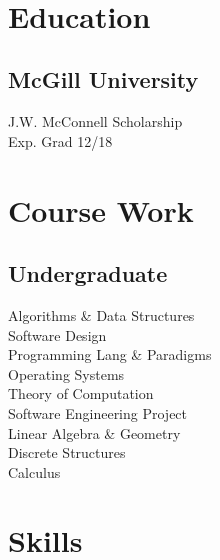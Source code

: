 \documentclass[]{allanwang-resume}
\begin{document}
\header

\begin{minipage}[t][][b]{0.33\textwidth}~


	\vspace{0.26cm}

	\section{Education}
	\subsection{McGill University}
	J.W. McConnell Scholarship \\
	Exp. Grad 12/18
	\sectionsep

	\section{Course Work}
	\subsection{Undergraduate}
	Algorithms \& Data Structures \\
	Software Design \\
	Programming Lang \& Paradigms \\
	Operating Systems \\
	Theory of Computation \\
	Software Engineering Project \\
	Linear Algebra \& Geometry \\
	Discrete Structures \\
	Calculus \\
	\sectionsep

	\section{Skills}

\end{minipage}
\end{document}
